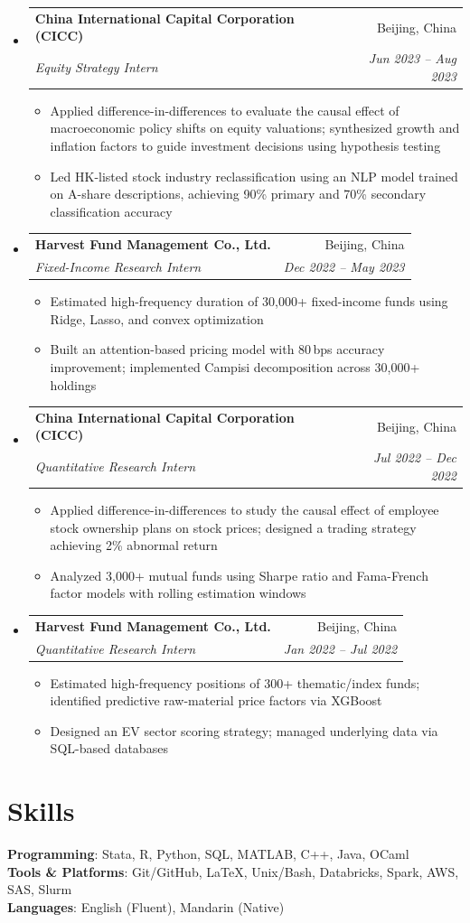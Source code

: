\documentclass[letterpaper,11pt]{article}
\makeatletter
\newcommand{\resumeItem}[1]{
  \item\small{#1 \vspace{-2pt}}
}
\newcommand{\resumeSubheading}[4]{
  \vspace{-2pt}\item
    \begin{tabular*}{0.97\textwidth}[t]{l@{\extracolsep{\fill}}r}
      \textbf{#1} & \small #2 \\
      \textit{\small#3} & \textit{\small #4} \\
    \end{tabular*}\vspace{-7pt}
}
\newcommand{\resumeSubHeadingListStart}{\begin{itemize}[leftmargin=*, label={}]}
\newcommand{\resumeSubHeadingListEnd}{\end{itemize}}
\newcommand{\resumeItemListStart}{\begin{itemize}}
\newcommand{\resumeItemListEnd}{\end{itemize}\vspace{-5pt}}
\makeatother
\begin{document}
\resumeSubHeadingListStart

  \resumeSubheading
    {China International Capital Corporation (CICC)}{Beijing, China}
    {Equity Strategy Intern}{Jun 2023 -- Aug 2023}
    \resumeItemListStart
      \resumeItem{Applied difference-in-differences to evaluate the causal effect of macroeconomic policy shifts on equity valuations; synthesized growth and inflation factors to guide investment decisions using hypothesis testing}
      \resumeItem{Led HK-listed stock industry reclassification using an NLP model trained on A-share descriptions, achieving 90\% primary and 70\% secondary classification accuracy}
    \resumeItemListEnd

  \resumeSubheading
    {Harvest Fund Management Co., Ltd.}{Beijing, China}
    {Fixed-Income Research Intern}{Dec 2022 -- May 2023}
    \resumeItemListStart
      \resumeItem{Estimated high-frequency duration of 30,000+ fixed-income funds using Ridge, Lasso, and convex optimization}
      \resumeItem{Built an attention-based pricing model with 80\,bps accuracy improvement; implemented Campisi decomposition across 30,000+ holdings}
    \resumeItemListEnd

  \resumeSubheading
    {China International Capital Corporation (CICC)}{Beijing, China}
    {Quantitative Research Intern}{Jul 2022 -- Dec 2022}
    \resumeItemListStart
      \resumeItem{Applied difference-in-differences to study the causal effect of employee stock ownership plans on stock prices; designed a trading strategy achieving 2\% abnormal return}
      \resumeItem{Analyzed 3,000+ mutual funds using Sharpe ratio and Fama-French factor models with rolling estimation windows}
    \resumeItemListEnd

  \resumeSubheading
    {Harvest Fund Management Co., Ltd.}{Beijing, China}
    {Quantitative Research Intern}{Jan 2022 -- Jul 2022}
    \resumeItemListStart
      \resumeItem{Estimated high-frequency positions of 300+ thematic/index funds; identified predictive raw-material price factors via XGBoost}
      \resumeItem{Designed an EV sector scoring strategy; managed underlying data via SQL-based databases}
    \resumeItemListEnd

\resumeSubHeadingListEnd


\section{Skills}
\begin{itemize}[leftmargin=0.15in, label={}]
  \small{\item{
    \textbf{Programming}{: Stata, R, Python, SQL, MATLAB, C++, Java, OCaml} \\
    \textbf{Tools \& Platforms}{: Git/GitHub, \LaTeX, Unix/Bash, Databricks, Spark, AWS, SAS, Slurm} \\
    \textbf{Languages}{: English (Fluent), Mandarin (Native)}
  }}
\end{itemize}
\end{document}
